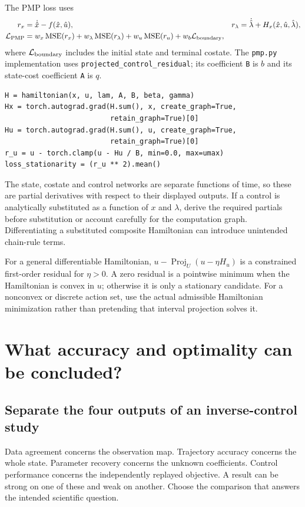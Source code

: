 \documentclass[11pt,a4paper]{article}
\DeclareMathOperator{\proj}{Proj}
\theoremstyle{definition}
\theoremstyle{remark}
\begin{document}
The PMP loss uses
\begin{align}
r_x&=\dot{\hat x}-f(\hat x,\hat u), &
r_\lambda&=\dot{\hat\lambda}+H_x(\hat x,\hat u,\hat\lambda),\nonumber\\
\mathcal L_{\rm PMP}&=w_x\operatorname{MSE}(r_x)+w_\lambda\operatorname{MSE}(r_\lambda)
+w_u\operatorname{MSE}(r_u)+w_b\mathcal L_{\rm boundary},\label{eq:pmp-loss}
\end{align}
where $\mathcal L_{\rm boundary}$ includes the initial state and terminal costate. The \texttt{pmp.py} implementation uses \texttt{projected\_control\_residual}; its coefficient \texttt{B} is $b$ and its state-cost coefficient \texttt{A} is $q$.

\begin{lstlisting}[caption={The bounded Hamiltonian condition used in training}]
H = hamiltonian(x, u, lam, A, B, beta, gamma)
Hx = torch.autograd.grad(H.sum(), x, create_graph=True,
                         retain_graph=True)[0]
Hu = torch.autograd.grad(H.sum(), u, create_graph=True,
                         retain_graph=True)[0]
r_u = u - torch.clamp(u - Hu / B, min=0.0, max=umax)
loss_stationarity = (r_u ** 2).mean()
\end{lstlisting}
The state, costate and control networks are separate functions of time, so these are partial derivatives with respect to their displayed outputs. If a control is analytically substituted as a function of $x$ and $\lambda$, derive the required partials before substitution or account carefully for the computation graph. Differentiating a substituted composite Hamiltonian can introduce unintended chain-rule terms.

For a general differentiable Hamiltonian, $u-\proj_U(u-\eta H_u)$ is a constrained first-order residual for $\eta>0$. A zero residual is a pointwise minimum when the Hamiltonian is convex in $u$; otherwise it is only a stationary candidate. For a nonconvex or discrete action set, use the actual admissible Hamiltonian minimization rather than pretending that interval projection solves it.

\section{What accuracy and optimality can be concluded?}
\subsection{Separate the four outputs of an inverse-control study}
Data agreement concerns the observation map. Trajectory accuracy concerns the whole state. Parameter recovery concerns the unknown coefficients. Control performance concerns the independently replayed objective. A result can be strong on one of these and weak on another. Choose the comparison that answers the intended scientific question.
\end{document}
